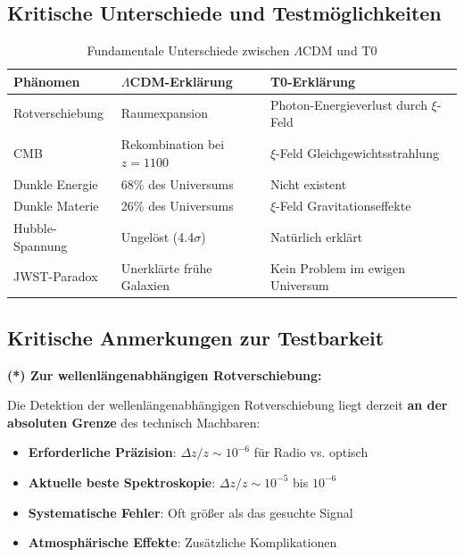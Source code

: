 \documentclass[12pt,a4paper]{article}
\begin{document}
\subsection{Kritische Unterschiede und Testmöglichkeiten}
\label{subsec:critical_differences}

\begin{table}[h]
	\centering
	\begin{tabular}{p{4cm}p{5cm}p{5cm}}
		\toprule
		\textbf{Phänomen} & \textbf{$\Lambda$CDM-Erklärung} & \textbf{T0-Erklärung} \\
		\midrule
		Rotverschiebung & Raumexpansion & Photon-Energieverlust durch $\xi$-Feld \\
		CMB & Rekombination bei $z=1100$ & $\xi$-Feld Gleichgewichtsstrahlung \\
		Dunkle Energie & 68\% des Universums & Nicht existent \\
		Dunkle Materie & 26\% des Universums & $\xi$-Feld Gravitationseffekte \\
		Hubble-Spannung & Ungelöst (4.4$\sigma$) & Natürlich erklärt \\
		JWST-Paradox & Unerklärte frühe Galaxien & Kein Problem im ewigen Universum \\
		\bottomrule
	\end{tabular}
	\caption{Fundamentale Unterschiede zwischen $\Lambda$CDM und T0}
\end{table}

\subsection{Kritische Anmerkungen zur Testbarkeit}
\label{subsec:testability_notes}

\textbf{(*) Zur wellenlängenabhängigen Rotverschiebung:}

Die Detektion der wellenlängenabhängigen Rotverschiebung liegt derzeit \textbf{an der absoluten Grenze} des technisch Machbaren:

\begin{itemize}
	\item \textbf{Erforderliche Präzision}: $\Delta z/z \sim 10^{-6}$ für Radio vs. optisch
	\item \textbf{Aktuelle beste Spektroskopie}: $\Delta z/z \sim 10^{-5}$ bis $10^{-6}$
	\item \textbf{Systematische Fehler}: Oft größer als das gesuchte Signal
	\item \textbf{Atmosphärische Effekte}: Zusätzliche Komplikationen
\end{itemize}
\end{document}
